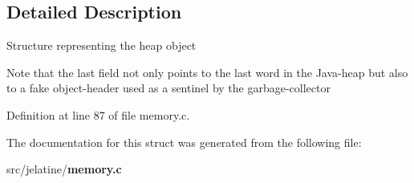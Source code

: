 \subsection{Detailed Description}
Structure representing the heap object

Note that the last field not only points to the last word in the Java-\/heap but also to a fake object-\/header used as a sentinel by the garbage-\/collector 

Definition at line 87 of file memory.c.



The documentation for this struct was generated from the following file:\begin{DoxyCompactItemize}
\item 
src/jelatine/{\bf memory.c}\end{DoxyCompactItemize}
